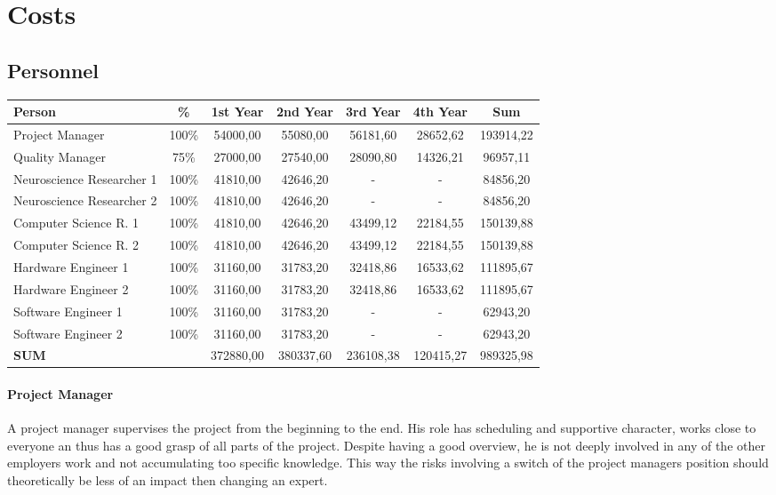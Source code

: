 \section{Costs}
\label{sect:costs}
\subsection{Personnel}

\begin{tabular}{|l|c|c|c|c|c|c|}
\hline 
Person & \% & 1st Year & 2nd Year & 3rd Year & 4th Year & Sum \\ 
\hline 
Project Manager & 100\% & 54000,00 & 55080,00 & 56181,60 & 28652,62 & 193914,22 \\ 
\hline 
Quality Manager & 75\% & 27000,00 & 27540,00 & 28090,80 & 14326,21 & 96957,11 \\ 
\hline 
Neuroscience Researcher 1 & 100\% & 41810,00 & 42646,20 & - & - & 84856,20 \\ 
\hline 
Neuroscience Researcher 2 & 100\% & 41810,00 & 42646,20 & - & - & 84856,20 \\ 
\hline 
Computer Science R. 1 & 100\% & 41810,00 & 42646,20 & 43499,12 & 22184,55 & 150139,88 \\ 
\hline 
Computer Science R. 2 & 100\% & 41810,00 & 42646,20 & 43499,12 & 22184,55 & 150139,88 \\ 
\hline 
Hardware Engineer 1 & 100\% & 31160,00 & 31783,20 & 32418,86 & 16533,62 & 111895,67 \\ 
\hline 
Hardware Engineer 2 & 100\% & 31160,00 & 31783,20 & 32418,86 & 16533,62 & 111895,67 \\ 
\hline 
Software Engineer 1 & 100\% & 31160,00 & 31783,20 & - & - & 62943,20 \\ 
\hline 
Software Engineer 2 & 100\% & 31160,00 & 31783,20 & - & - & 62943,20 \\ 
\hline 
\textbf{SUM} & & 372880,00 & 380337,60 & 236108,38 & 120415,27 & 989325,98 \\ 
\hline 
\end{tabular} 

\paragraph{Project Manager}
A project manager supervises the project from the beginning to the end. His role has scheduling and supportive character, works close to everyone an thus has a good grasp of all parts of the project. Despite having a good overview, he is not deeply involved in any of the other employers work and not accumulating too specific knowledge. This way the risks involving a switch of the project managers position should theoretically be less of an impact then changing an expert.

